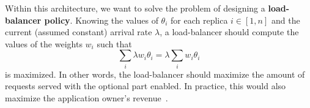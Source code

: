 Within this architecture, we want to solve the problem of designing a
{\bf load-balancer policy}. Knowing the values of $\theta_i$ for each
replica $i \in [1, n]$ and the current (assumed constant) arrival rate
$\lambda$, a load-balancer should compute the values of the weights
$w_i$ such that
\begin{equation}
\sum_{i} \lambda w_i \theta_i = \lambda \sum_i w_i \theta_i
\label{eq:objective}
\end{equation}
is maximized. In other words, the load-balancer should maximize the
amount of requests served with the optional part enabled. In practice,
this would also maximize the application owner's
revenue~\cite{cloudish-tr}.
